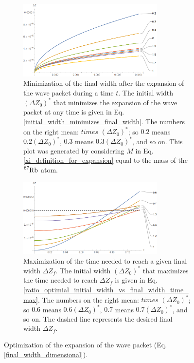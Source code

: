 \documentclass{article}
\begin{document}
\begin{figure}
    \centering
    \begin{subfigure}{1\textwidth}
        \centering
        \includegraphics[width=0.8\textwidth]{minimize_expansion_width.png}
        \caption{Minimization of the final width after the expansion of the wave packet during a time $t$. The initial width $(\Delta Z_{0})^{\ast}$ that minimizes the expansion of the wave packet at any time is given in Eq. \ref{initial_width_minimizes_final_width}. The numbers on the right mean: $times$ $(\Delta Z_{0})^{\ast}$; so $0.2$ means $0.2(\Delta Z_{0})^{\ast}$, $0.3$ means $0.3(\Delta Z_{0})^{\ast}$, and so on. This plot was generated by considering $M$ in Eq. \ref{xi_definition_for_expansion} equal to the mass of the $\ce{^{87}_{}Rb}$ atom.}
        \label{minimize_expansion_width}
    \end{subfigure}
    \hfill
    \begin{subfigure}{1\textwidth}
        \centering
        \includegraphics[width=0.8\textwidth]{maximize_expansion_time.png}
        \caption{Maximization of the time needed to reach a given final width  $\Delta Z_{f}$. The initial width $(\Delta Z_{0})^{\ast}$ that maximizes the time needed to reach $\Delta Z_{f}$ is given in Eq. \ref{ratio_optimial_initial_width_vs_final_width_time_max}. The numbers on the right mean: $times$ $(\Delta Z_{0})^{\ast}$; so $0.6$ means $0.6(\Delta Z_{0})^{\ast}$, $0.7$ means $0.7(\Delta Z_{0})^{\ast}$, and so on. The dashed line represents the desired final width $\Delta Z_{f}$.}
        \label{maximize_expansion_time}
    \end{subfigure}
    \caption{Optimization of the expansion of the wave packet (Eq. \ref{final_width_dimensional}).}
    \label{optimization_expansion_width}
\end{figure}
\end{document}
